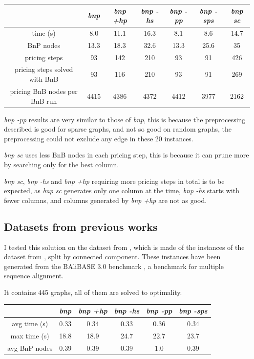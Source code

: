 \documentclass{article}
\begin{document}
\begin{center}
\begin{tabular}{ |c|c|c|c|c|c|c| }
 \hline
 & \textit{bnp}  & \textit{bnp +hp} & \textit{bnp -hs} & \textit{bnp -pp} & \textit{bnp -sps} & \textit{bnp sc} \\
 \hline
 time (s)                      & 8.0  & 11.1   & 16.3    & 8.1     & 8.6      & 14.7 \\
 \hline
 BnP nodes                     & 13.3 & 18.3   & 32.6    & 13.3    & 25.6     & 35 \\
 \hline
 pricing steps                 & 93   & 142    & 210     & 93      & 91       & 426 \\
 \hline
 pricing steps solved with BnB & 93   & 116    & 210     & 93      & 91       & 269 \\
 \hline
 pricing BnB nodes per BnB run & 4415 & 4386   & 4372    & 4412    & 3977     & 2162 \\
 \hline
\end{tabular}
\end{center}

\textit{bnp -pp} results are very similar to those of \textit{bnp},
this is because the preprocessing described is good for sparse graphs,
and not so good on random graphs, the preprocessing could not exclude any edge in these 20 instances.

\textit{bnp sc} uses less BnB nodes in each pricing step,
this is because it can prune more by searching only for the best column.

\textit{bnp sc}, \textit{bnp -hs} and \textit{bnp +hp} requiring more pricing steps in total is to be expected,
as \textit{bnp sc} generates only one column at the time, \textit{bnp -hs} starts with fewer columns,
and columns generated by \textit{bnp +hp} are not as good.

\subsection{Datasets from previous works}
\label{dfpw}
I tested this solution on the dataset from \parencite{ccc2025},
which is made of the instances of the dataset from \parencite{mop2012}, split by connected component.
These instances have been generated from the BAliBASE 3.0 benchmark \parencite{balibase},
a benchmark for multiple sequence alignment.

It contains 445 graphs, all of them are solved to optimality.

\begin{center}
\begin{tabular}{ |c|c|c|c|c|c| }
 \hline
& \textit{bnp}  & \textit{bnp +hp} & \textit{bnp -hs} & \textit{bnp -pp} & \textit{bnp -sps} \\
 \hline
 avg time (s)  & 0.33 & 0.34   & 0.33    & 0.36    & 0.34 \\
 \hline
 max time (s)  & 18.8 & 18.9   & 24.7    &  22.7   & 23.7 \\
 \hline
 avg BnP nodes & 0.39 & 0.39   & 0.39    & 1.0     & 0.39 \\
 \hline
\end{tabular}
\end{center}
\end{document}
